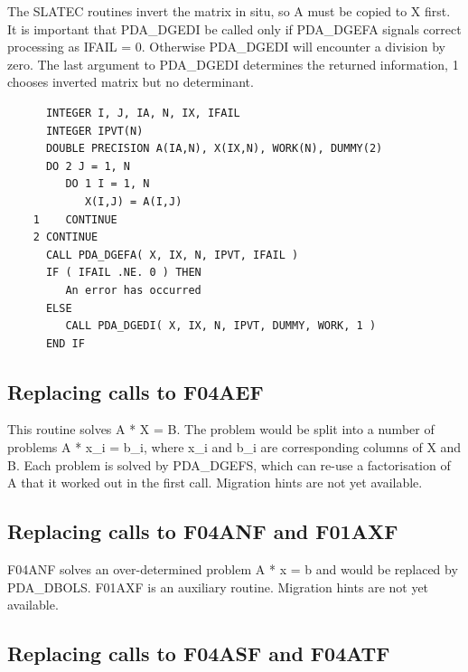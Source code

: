 \documentclass[11pt,twoside]{article}
\newcommand{\htmlref}[2]{#1}
\newcommand{\xlabel}[1]{}
\begin{document}
   The SLATEC routines invert the matrix in situ, so A must be copied to
   X first. It is important that
\htmlref{PDA\_DGEDI}{PDA\_DGEDI}
   be called only if
\htmlref{PDA\_DGEFA}{PDA\_DGEFA}
   signals
   correct processing as IFAIL = 0. Otherwise PDA\_DGEDI will encounter a
   division by zero. The last argument to PDA\_DGEDI
   determines the returned information, 1 chooses inverted matrix but no
   determinant.

\begin{verbatim}
      INTEGER I, J, IA, N, IX, IFAIL
      INTEGER IPVT(N)
      DOUBLE PRECISION A(IA,N), X(IX,N), WORK(N), DUMMY(2)
      DO 2 J = 1, N
         DO 1 I = 1, N
            X(I,J) = A(I,J)
    1    CONTINUE
    2 CONTINUE
      CALL PDA_DGEFA( X, IX, N, IPVT, IFAIL )
      IF ( IFAIL .NE. 0 ) THEN
         An error has occurred
      ELSE
         CALL PDA_DGEDI( X, IX, N, IPVT, DUMMY, WORK, 1 )
      END IF
\end{verbatim}


\subsection{\xlabel{replacing_calls_to_f04aef}Replacing calls to F04AEF}

   This routine solves A * X = B. The problem would be split into a
   number of problems A * x\_i = b\_i, where x\_i and b\_i are
   corresponding columns of X and B. Each problem is solved by
\htmlref{PDA\_DGEFS,}{PDA\_DGEFS}
   which can re-use a factorisation of A that it worked out in the first
   call.
   Migration hints are not yet available.


\subsection{\xlabel{replacing_calls_to_f04anf_and_f01axf}Replacing calls to F04ANF and F01AXF}

   F04ANF solves an over-determined problem A * x = b and would be
   replaced by
\htmlref{PDA\_DBOLS.}{PDA\_DBOLS}
   F01AXF is an auxiliary routine.
   Migration hints are not yet available.


\subsection{\xlabel{replacing_calls_to_f04asf_and_f04atf}Replacing calls to F04ASF and F04ATF}
\end{document}
